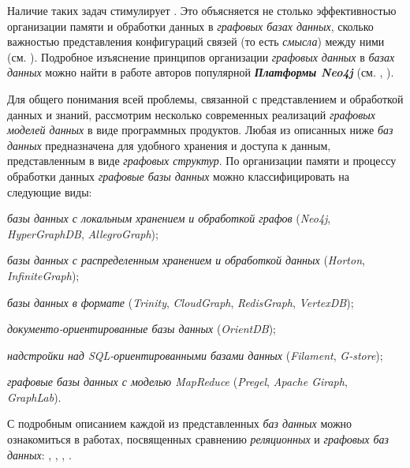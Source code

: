 Наличие таких задач стимулирует . Это объясняется не столько эффективностью организации памяти и обработки данных в \textit{графовых базах данных}, сколько важностью представления конфигураций связей (то есть \textit{смысла}) между ними (см. ). Подробное изъяснение принципов организации \textit{графовых данных} в \textit{базах данных} можно найти в работе авторов популярной  \textbf{\textit{Платформы Neo4j}} (см. , ).

Для общего понимания всей проблемы, связанной с представлением и обработкой данных и знаний, рассмотрим несколько современных реализаций \textit{графовых моделей данных} в виде программных продуктов. Любая из описанных ниже \textit{баз данных} предназначена для удобного хранения и доступа к данным, представленным в виде \textit{графовых структур}. По организации памяти и процессу обработки данных \textit{графовые базы данных} можно классифицировать на следующие виды:
\begin{textitemize}
    \item \textit{базы данных с локальным хранением и обработкой графов} (\textit{Neo4j}, \textit{HyperGraphDB}, \textit{AllegroGraph});
    \item \textit{базы данных с распределенным хранением и обработкой данных} (\textit{Horton}, \textit{InfiniteGraph});
    \item \textit{базы данных в формате } (\textit{Trinity}, \textit{CloudGraph}, \textit{RedisGraph}, \textit{VertexDB});
    \item \textit{документо-ориентированные базы данных} (\textit{OrientDB});
    \item \textit{надстройки над SQL-ориентированными базами данных} (\textit{Filament}, \textit{G-store});
    \item \textit{графовые базы данных с моделью MapReduce} (\textit{Pregel}, \textit{Apache Giraph}, \textit{GraphLab}).
\end{textitemize}

С подробным описанием каждой из представленных \textit{баз данных} можно ознакомиться в работах, посвященных сравнению \textit{реляционных} и \textit{графовых баз данных}: , , , .

